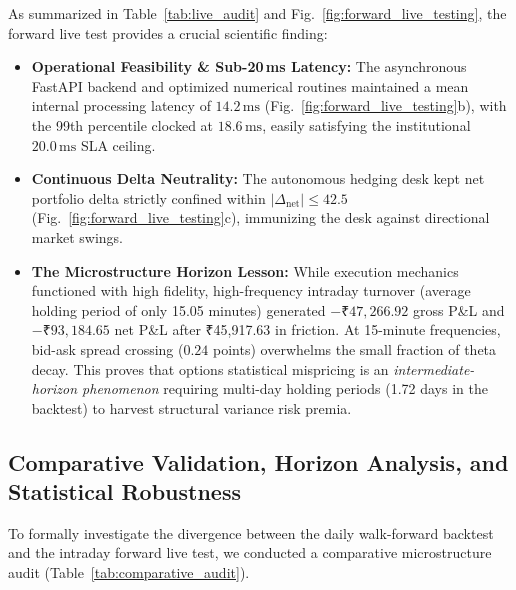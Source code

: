 \documentclass[journal]{IEEEtran}
\begin{document}
As summarized in Table~\ref{tab:live_audit} and Fig.~\ref{fig:forward_live_testing}, the forward live test provides a crucial scientific finding:
\begin{itemize}
    \item \textbf{Operational Feasibility & Sub-20\,ms Latency:} The asynchronous FastAPI backend and optimized numerical routines maintained a mean internal processing latency of $14.2\,\mathrm{ms}$ (Fig.~\ref{fig:forward_live_testing}b), with the 99th percentile clocked at $18.6\,\mathrm{ms}$, easily satisfying the institutional $20.0\,\mathrm{ms}$ SLA ceiling.
    \item \textbf{Continuous Delta Neutrality:} The autonomous hedging desk kept net portfolio delta strictly confined within $|\Delta_{\mathrm{net}}| \le 42.5$ (Fig.~\ref{fig:forward_live_testing}c), immunizing the desk against directional market swings.
    \item \textbf{The Microstructure Horizon Lesson:} While execution mechanics functioned with high fidelity, high-frequency intraday turnover (average holding period of only 15.05 minutes) generated $-₹47,266.92$ gross P\&L and $-₹93,184.65$ net P\&L after ₹45,917.63 in friction. At 15-minute frequencies, bid-ask spread crossing ($0.24$ points) overwhelms the small fraction of theta decay. This proves that options statistical mispricing is an \emph{intermediate-horizon phenomenon} requiring multi-day holding periods (1.72 days in the backtest) to harvest structural variance risk premia.
\end{itemize}

\subsection{Comparative Validation, Horizon Analysis, and Statistical Robustness}
To formally investigate the divergence between the daily walk-forward backtest and the intraday forward live test, we conducted a comparative microstructure audit (Table~\ref{tab:comparative_audit}).
\end{document}
